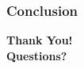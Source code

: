 \documentclass[11pt]{beamer}
\begin{document}
\begin{frame}
    \frametitle{Conclusion}
    \begin{center}
        \Large \textbf{Thank You!} \\
        \vspace{1cm}
        \normalsize \textbf{Questions?}
    \end{center}
\end{frame}
\end{document}
